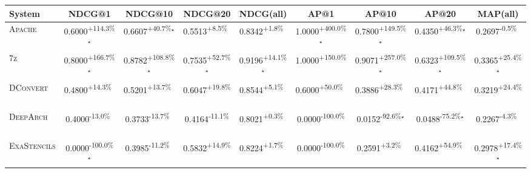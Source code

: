 \begin{table}[htbp]
\centering
\renewcommand{\arraystretch}{1.2}
\begin{tabular}{l|cccc|cccc}
\hline
System & NDCG@1 & NDCG@10 & NDCG@20 & NDCG(all) & AP@1 & AP@10 & AP@20 & MAP(all) \\ \hline
\textsc{Apache} & \cellcolor{green!30}0.6000\textsuperscript{+114.3\%}$^\star$ & \cellcolor{green!30}0.6607\textsuperscript{+40.7\%}$^\star$ & \cellcolor{green!30}0.5513\textsuperscript{+8.5\%}$^{\,\,\,}$ & \cellcolor{green!30}0.8342\textsuperscript{+1.8\%}$^{\,\,\,}$ & \cellcolor{green!30}1.0000\textsuperscript{+400.0\%}$^\star$ & \cellcolor{green!30}0.7800\textsuperscript{+149.5\%}$^\star$ & \cellcolor{green!30}0.4350\textsuperscript{+46.3\%}$^\star$ & \cellcolor{red!30}0.2697\textsuperscript{-0.5\%}$^{\,\,\,}$ \\
\textsc{7z} & \cellcolor{green!30}0.8000\textsuperscript{+166.7\%}$^\star$ & \cellcolor{green!30}0.8782\textsuperscript{+108.8\%}$^\star$ & \cellcolor{green!30}0.7535\textsuperscript{+52.7\%}$^\star$ & \cellcolor{green!30}0.9196\textsuperscript{+14.1\%}$^\star$ & \cellcolor{green!30}1.0000\textsuperscript{+150.0\%}$^{\,\,\,}$ & \cellcolor{green!30}0.9071\textsuperscript{+257.0\%}$^\star$ & \cellcolor{green!30}0.6323\textsuperscript{+109.5\%}$^\star$ & \cellcolor{green!30}0.3365\textsuperscript{+25.4\%}$^\star$ \\
\textsc{DConvert} & \cellcolor{green!30}0.4800\textsuperscript{+14.3\%}$^{\,\,\,}$ & \cellcolor{green!30}0.5201\textsuperscript{+13.7\%}$^{\,\,\,}$ & \cellcolor{green!30}0.6047\textsuperscript{+19.8\%}$^{\,\,\,}$ & \cellcolor{green!30}0.8544\textsuperscript{+5.1\%}$^{\,\,\,}$ & \cellcolor{green!30}0.6000\textsuperscript{+50.0\%}$^{\,\,\,}$ & \cellcolor{green!30}0.3886\textsuperscript{+28.3\%}$^{\,\,\,}$ & \cellcolor{green!30}0.4171\textsuperscript{+44.8\%}$^{\,\,\,}$ & \cellcolor{green!30}0.3219\textsuperscript{+24.4\%}$^{\,\,\,}$ \\
\textsc{DeepArch} & \cellcolor{red!30}0.4000\textsuperscript{-13.0\%}$^{\,\,\,}$ & \cellcolor{red!30}0.3733\textsuperscript{-13.7\%}$^{\,\,\,}$ & \cellcolor{red!30}0.4164\textsuperscript{-11.1\%}$^{\,\,\,}$ & \cellcolor{green!30}0.8021\textsuperscript{+0.3\%}$^{\,\,\,}$ & \cellcolor{red!30}0.0000\textsuperscript{-100.0\%}$^{\,\,\,}$ & \cellcolor{red!30}0.0152\textsuperscript{-92.6\%}$^\star$ & \cellcolor{red!30}0.0488\textsuperscript{-75.2\%}$^\star$ & \cellcolor{red!30}0.2267\textsuperscript{-4.3\%}$^{\,\,\,}$ \\
\textsc{ExaStencils} & \cellcolor{red!30}0.0000\textsuperscript{-100.0\%}$^\star$ & \cellcolor{red!30}0.3985\textsuperscript{-11.2\%}$^{\,\,\,}$ & \cellcolor{green!30}0.5832\textsuperscript{+14.9\%}$^{\,\,\,}$ & \cellcolor{green!30}0.8224\textsuperscript{+1.7\%}$^{\,\,\,}$ & \cellcolor{red!30}0.0000\textsuperscript{-100.0\%}$^{\,\,\,}$ & \cellcolor{green!30}0.2591\textsuperscript{+3.2\%}$^{\,\,\,}$ & \cellcolor{green!30}0.4162\textsuperscript{+54.9\%}$^{\,\,\,}$ & \cellcolor{green!30}0.2978\textsuperscript{+17.4\%}$^\star$ \\

\end{tabular}
\end{table}
